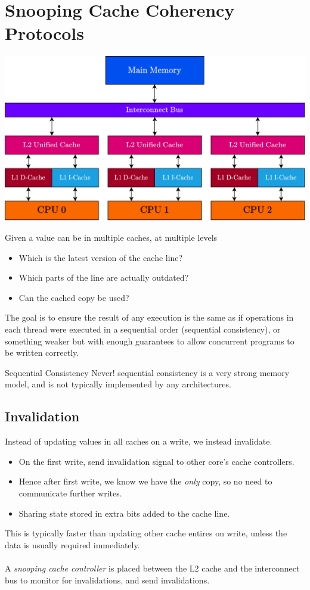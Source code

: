 \section{Snooping Cache Coherency Protocols}
\begin{center}
    \includegraphics[width=.8\textwidth]{parallel_programming/images/basic_cache_hierarchy.drawio.png}
\end{center}
Given a value can be in multiple caches, at multiple levels
\begin{itemize}
    \item Which is the latest version of the cache line?
    \item Which parts of the line are actually outdated?
    \item Can the cached copy be used?
\end{itemize}
The goal is to ensure the result of any execution is the same as if operations in each thread were executed in a sequential order (sequential consistency), or something weaker but with enough guarantees to allow concurrent programs to be written correctly.
\begin{sidenotebox}{Sequential Consistency Never!}
    sequential consistency is a very strong memory model, and is not typically implemented by any architectures.
\end{sidenotebox}

\subsection{Invalidation}
Instead of updating values in all caches on a write, we instead invalidate.
\begin{itemize}
    \item On the first write, send invalidation signal to other core's cache controllers.
    \item Hence after first write, we know we have the \textit{only} copy, so no need to communicate further writes.
    \item Sharing state stored in extra bits added to the cache line.
\end{itemize}
This is typically faster than updating other cache entires on write, unless the data is usually required immediately.
\\
\\ A \textit{snooping cache controller} is placed between the L2 cache and the interconnect bus to monitor for invalidations, and send invalidations.

